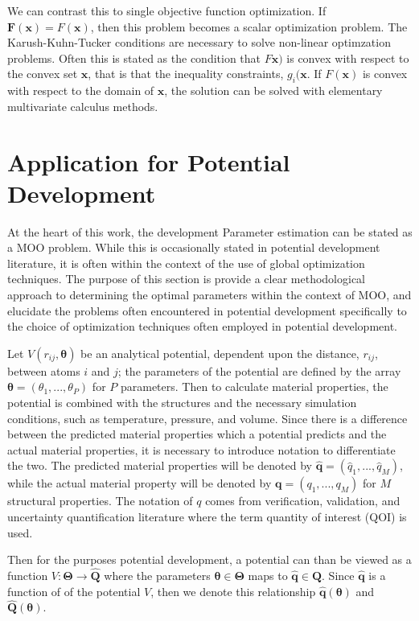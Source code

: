 We can contrast this to single objective function optimization.  
If $\bm{F}(\bm{x}) = F(\bm{x})$, then this problem becomes a scalar optimization problem.  
The Karush-Kuhn-Tucker conditions \cite{karush1939_kkt,kuhn1951_kkt} are necessary to solve non-linear optimzation problems.
Often this is stated as the condition that $F\bm{x})$ is convex with respect to the convex set $\bm{x}$, that is that the inequality constraints, $g_i(\bm{x}$.
If $F(\bm{x})$ is convex with respect to the domain of $\bm{x}$, the solution can be solved with elementary multivariate calculus methods.  

\section{Application for Potential Development}

At the heart of this work, the development
Parameter estimation can be stated as a MOO problem.
While this is occasionally stated in potential development literature, it is often within the context of the use of global optimization techniques.
The purpose of this section is provide a clear methodological approach to determining the optimal parameters within the context of MOO, and elucidate the problems often encountered in potential development specifically to the choice of optimization techniques often employed in potential development.

Let $V(r_{ij},\bm{\theta})$ be an analytical potential, dependent upon the distance, $r_{ij}$, between atoms $i$ and $j$; the parameters of the potential are defined by the array $\bm{\theta}=(\theta_1,...,\theta_P)$ for $P$ parameters.
Then to calculate material properties, the potential is combined with the structures and the necessary simulation conditions, such as temperature, pressure, and volume.
Since there is a difference between the predicted material properties which a potential predicts and the actual material properties, it is necessary to introduce notation to differentiate the two.
The predicted material properties will be denoted by $\hat{\bm{q}} = (\hat{q}_1,...,\hat{q}_M)$, while the actual material property will be denoted by $\bm{q} = (q_1,...,q_M)$ for $M$ structural properties.  The notation of $q$ comes from verification, validation, and uncertainty quantification literature where the term quantity of interest (QOI) is used.

Then for the purposes potential development, a potential can than be viewed as a function $V:\bm{\Theta} \rightarrow \hat{\bm{Q}}$ where the parameters $\bm{\theta} \in \bm{\Theta}$ maps to $\hat{\bm{q}} \in \hat{\bm{Q}}$.
Since $\hat{\bm{q}}$ is a function of of the potential $V$, then we denote this relationship
$\hat{\bm{q}}(\bm{\theta})$ and
$\hat{\bm{Q}}(\bm{\theta})$.




